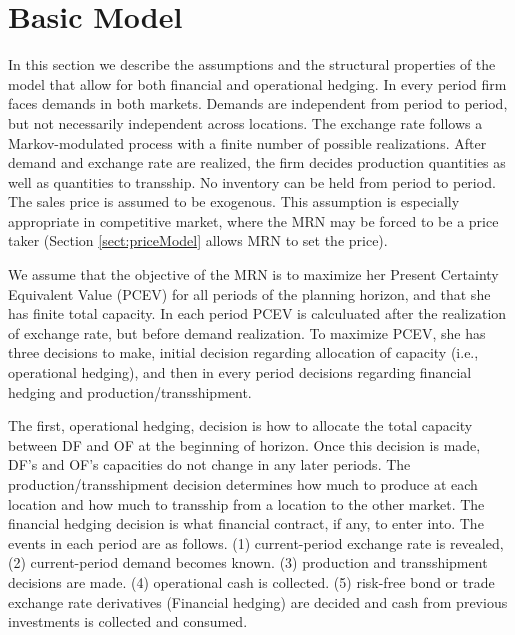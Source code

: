 \documentclass[mnsc,nonblindrev,copyedit]{informs2_wz} %
\begin{document}
\section{Basic Model \label{sect:basicModel}}

In this section we describe the assumptions and the structural properties of the model that allow for both financial and operational hedging.  In every period firm faces demands in both markets.  Demands are independent from period to period, but not necessarily independent across locations.  The exchange rate follows a Markov-modulated process with a finite number of possible realizations.  After demand and exchange rate are realized, the firm decides production quantities as well as quantities to transship.  No inventory can be held from period to period.  The sales price is assumed to be exogenous.  This assumption is especially appropriate in competitive market, where the MRN may be forced to be a price taker (Section \ref{sect:priceModel} allows MRN to set the price). 

We assume that the objective of the MRN is to maximize her Present Certainty Equivalent Value (PCEV) for all periods of the planning horizon, and that she has finite total capacity. In each period PCEV is calculuated after the realization of exchange rate, but before demand realization.  To maximize PCEV, she has three decisions to make, initial decision regarding allocation of capacity (i.e., operational hedging), and then in every period decisions regarding financial hedging and production/transshipment.

The first, operational hedging, decision is how to allocate the total capacity between DF and OF at the beginning of horizon.  Once this decision is made, DF's and OF's capacities do not change in any later periods. The production/transshipment decision determines how much to produce at each location and how much to transship from a location to the other market. The financial hedging decision is what financial contract, if any, to enter into. The events in each period are as follows. (1) current-period exchange rate is revealed, (2) current-period demand becomes known. (3) production and transshipment decisions are made. (4) operational cash is collected. (5) risk-free bond or trade exchange rate derivatives (Financial hedging) are decided and cash from previous investments is collected and consumed.
\end{document}
